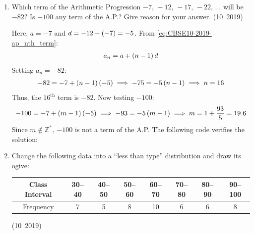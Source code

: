 \begin{enumerate}[label=\thesubsection.\arabic*, ref=\thesubsection.\theenumi]
	\solution
	Let the original length of cloth be $x$ metres.
	The original rate per metre is $\frac{200}{x}$.
	With the new conditions:
	\begin{align}
		\brak{x + 5}\brak{\frac{200}{x} - 2} = 200
	\end{align}
	Expanding:
	\begin{align}
		200 - 2x + \frac{1000}{x} - 10 &= 200 \\
		-2x - 10 + \frac{1000}{x} &= 0 \\
		x^2 + 5x - 500 &= 0
	\end{align}
	Factoring:
	\begin{align}
		\brak{x + 25}\brak{x - 20} = 0 \implies x = 20\text{ m} \quad (\text{since } x > 0)
	\end{align}
	The original rate is:
	\begin{align}
		\text{Rate} = \frac{200}{20} = 10\text{ Rs./m}
	\end{align}

	
	\item Which term of the Arithmetic Progression $-7,\,-12,\,-17,\,-22,\,\ldots $ will be $-82$? Is $-100$ any term of the A.P.? Give reason for your answer.
	\hfill (10~2019)
	
	\solution
	Here, $a = -7$ and $d = -12 - \left(-7\right) = -5$.
	From \eqref{eq:CBSE10-2019-ap_nth_term}:
	\begin{align}
		a_n = a + \left(n - 1\right)d
	\end{align}
	Setting $a_n = -82$:
	\begin{align}
		-82 = -7 + \left(n - 1\right)\left(-5\right) \implies -75 = -5\left(n - 1\right) \implies n = 16
	\end{align}
	Thus, the $16^{\text{th}}$ term is $-82$.
	Now testing $-100$:
	\begin{align}
		-100 = -7 + \left(m - 1\right)\left(-5\right) \implies -93 = -5\left(m - 1\right) \implies m = 1 + \frac{93}{5} = 19.6
	\end{align}
	Since $m \notin \mathbb{Z}^^+$, $-100$ is not a term of the A.P.
	The following code verifies the solution:

	\item Change the following data into a ``less than type'' distribution and draw its ogive:
	\begin{center}
		\begin{tabular}{|c|c|c|c|c|c|c|c|}
			\hline
			Class Interval & 30--40 & 40--50 & 50--60 & 60--70 & 70--80 & 80--90 & 90--100\\
			\hline
			Frequency & 7 & 5 & 8 & 10 & 6 & 6 & 8\\
			\hline
		\end{tabular}
	\end{center}
	\hfill (10~2019)
	

\end{enumerate}
